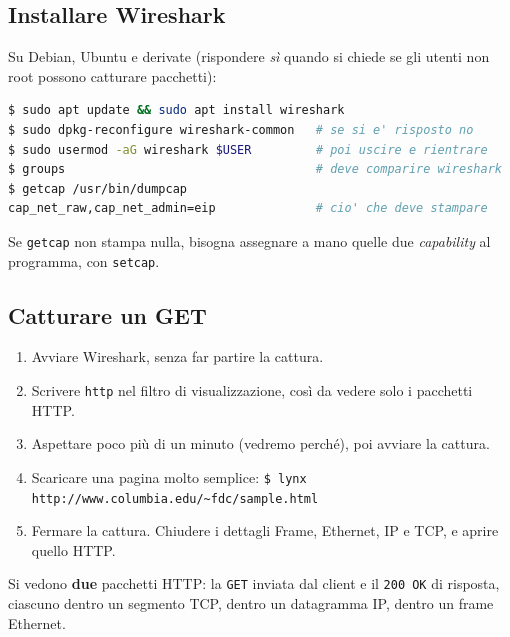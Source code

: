 \subsection{Installare Wireshark}

Su Debian, Ubuntu e derivate (rispondere \emph{sì} quando si chiede se gli utenti non root possono catturare
pacchetti):

\begin{lstlisting}[language=bash]
$ sudo apt update && sudo apt install wireshark
$ sudo dpkg-reconfigure wireshark-common   # se si e' risposto no
$ sudo usermod -aG wireshark $USER         # poi uscire e rientrare
$ groups                                   # deve comparire wireshark
$ getcap /usr/bin/dumpcap
cap_net_raw,cap_net_admin=eip              # cio' che deve stampare
\end{lstlisting}

Se \texttt{getcap} non stampa nulla, bisogna assegnare a mano quelle due \emph{capability} al programma, con
\texttt{setcap}.

\subsection{Catturare un GET}

\begin{enumerate}
    \item Avviare Wireshark, senza far partire la cattura.
    \item Scrivere \texttt{http} nel filtro di visualizzazione, così da vedere solo i pacchetti HTTP.
    \item Aspettare poco più di un minuto (vedremo perché), poi avviare la cattura.
    \item Scaricare una pagina molto semplice: \texttt{\$ lynx http://www.columbia.edu/\textasciitilde fdc/sample.html}
    \item Fermare la cattura. Chiudere i dettagli Frame, Ethernet, IP e TCP, e aprire quello HTTP.
\end{enumerate}

Si vedono \textbf{due} pacchetti HTTP: la \texttt{GET} inviata dal client e il \texttt{200 OK} di risposta,
ciascuno dentro un segmento TCP, dentro un datagramma IP, dentro un frame Ethernet.


